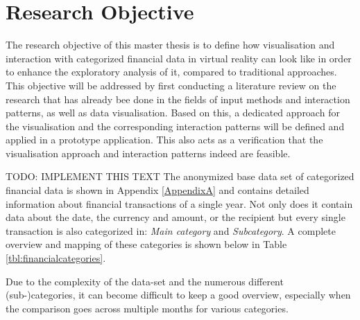 
\section{Research Objective}

The research objective of this master thesis is to define how visualisation and interaction with categorized financial data in virtual reality can look like in order to enhance the exploratory analysis of it, compared to traditional approaches. \newline
This objective will be addressed by first conducting a literature review on the research that has already bee done in the fields of input methods and interaction patterns, as well as data visualisation. Based on this, a dedicated approach for the visualisation and the corresponding interaction patterns will be defined and applied in a prototype application. This also acts as a verification that the visualisation approach and interaction patterns indeed are feasible.


TODO: IMPLEMENT THIS TEXT
The anonymized base data set of categorized financial data is shown in Appendix \ref{AppendixA} and contains detailed information about financial transactions of a single year. Not only does it contain data about the date, the currency and amount, or the recipient but every single transaction is also categorized in: \textit{Main category} and \textit{Subcategory}. A complete overview and mapping of these categories is shown below in Table \ref{tbl:financialcategories}.

Due to the complexity of the data-set and the numerous different (sub-)categories, it can become difficult to keep a good overview, especially when the comparison goes across multiple months for various categories.







